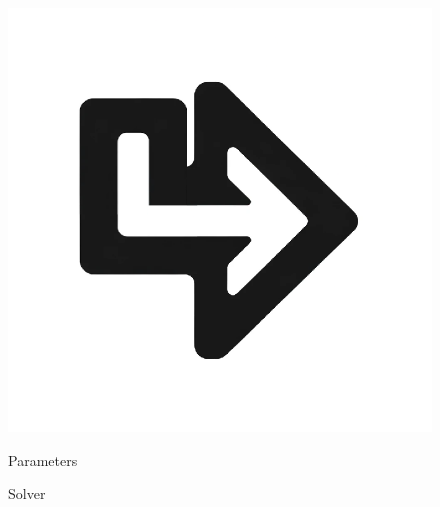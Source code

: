 \documentclass{beamer}
\begin{document}
\begin{frame}
\begin{figure}[htbp]
{\begin{minipage}[c][0.35\paperheight][c]{\linewidth}
\begin{minipage}{0.1\linewidth}
				\includegraphics[angle=180, width=\linewidth]{images/left_turn_arrow.eps}
			\end{minipage}
	\end{minipage}}
		\vfill
		\begin{minipage}[t][0.06\paperheight][t]{\linewidth}
			\begin{minipage}{0.18\linewidth}
				\caption*{\tiny Parameters}
			\end{minipage}
			\hfill
			\begin{minipage}{0.1\linewidth}
				\caption*{\tiny}
			\end{minipage}
			\hfill
			\begin{minipage}{0.18\linewidth}
				\caption*{\tiny Solver}
			\end{minipage}
			\hfill
			\begin{minipage}{0.1\linewidth}
				\caption*{\tiny}
			\end{minipage}
			\hfill
			\begin{minipage}{0.18\linewidth}
			\end{minipage}
			\hfill
			\begin{minipage}{0.1\linewidth}
				\caption*{\tiny}
			\end{minipage}
		\end{minipage}
		\begin{minipage}[c][0.33\paperheight][c]{\linewidth}

\end{minipage}
\end{figure}
\end{frame}
\end{document}

